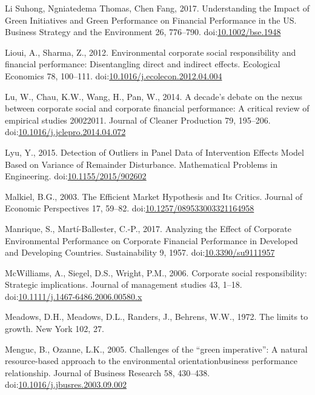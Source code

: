 \documentclass[12pt,]{article}
\begin{document}
\hypertarget{ref-LiSuhong2017}{}
Li Suhong, Ngniatedema Thomas, Chen Fang, 2017. Understanding the Impact
of Green Initiatives and Green Performance on Financial Performance in
the US. Business Strategy and the Environment 26, 776--790.
doi:\href{https://doi.org/10.1002/bse.1948}{10.1002/bse.1948}

\hypertarget{ref-Lioui2012}{}
Lioui, A., Sharma, Z., 2012. Environmental corporate social
responsibility and financial performance: Disentangling direct and
indirect effects. Ecological Economics 78, 100--111.
doi:\href{https://doi.org/10.1016/j.ecolecon.2012.04.004}{10.1016/j.ecolecon.2012.04.004}

\hypertarget{ref-Ludecadedebatenexus2014}{}
Lu, W., Chau, K.W., Wang, H., Pan, W., 2014. A decade's debate on the
nexus between corporate social and corporate financial performance: A
critical review of empirical studies 20022011. Journal of Cleaner
Production 79, 195--206.
doi:\href{https://doi.org/10.1016/j.jclepro.2014.04.072}{10.1016/j.jclepro.2014.04.072}

\hypertarget{ref-Lyu2015}{}
Lyu, Y., 2015. Detection of Outliers in Panel Data of Intervention
Effects Model Based on Variance of Remainder Disturbance. Mathematical
Problems in Engineering.
doi:\href{https://doi.org/10.1155/2015/902602}{10.1155/2015/902602}

\hypertarget{ref-Malkiel2003}{}
Malkiel, B.G., 2003. The Efficient Market Hypothesis and Its Critics.
Journal of Economic Perspectives 17, 59--82.
doi:\href{https://doi.org/10.1257/089533003321164958}{10.1257/089533003321164958}

\hypertarget{ref-ManriqueAnalyzingEffectCorporate2017}{}
Manrique, S., Martí-Ballester, C.-P., 2017. Analyzing the Effect of
Corporate Environmental Performance on Corporate Financial Performance
in Developed and Developing Countries. Sustainability 9, 1957.
doi:\href{https://doi.org/10.3390/su9111957}{10.3390/su9111957}

\hypertarget{ref-McWilliams2006}{}
McWilliams, A., Siegel, D.S., Wright, P.M., 2006. Corporate social
responsibility: Strategic implications. Journal of management studies
43, 1--18.
doi:\href{https://doi.org/10.1111/j.1467-6486.2006.00580.x}{10.1111/j.1467-6486.2006.00580.x}

\hypertarget{ref-Meadows1972}{}
Meadows, D.H., Meadows, D.L., Randers, J., Behrens, W.W., 1972. The
limits to growth. New York 102, 27.

\hypertarget{ref-Menguc2005}{}
Menguc, B., Ozanne, L.K., 2005. Challenges of the ``green imperative'':
A natural resource-based approach to the environmental
orientationbusiness performance relationship. Journal of Business
Research 58, 430--438.
doi:\href{https://doi.org/10.1016/j.jbusres.2003.09.002}{10.1016/j.jbusres.2003.09.002}
\end{document}
